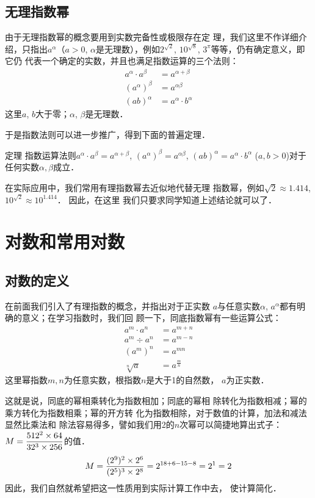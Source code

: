 \subsection{无理指数幂}
由于无理指数幂的概念要用到实数完备性或极限存在定
理，我们这里不作详细介绍，只指出$a^{\alpha}$（$a>0$, $\alpha$是无理数），例如$2^{\sqrt{2}}$, $10^{\sqrt{8}}$, $3^{\pi}$等等，仍有确定意义，即它仍
代表一个确定的实数，并且也满足指数运算的三个法则：
\[\begin{split}
    a^{\alpha}\cdot a^{\beta}&=a^{\alpha+\beta}\\
    \left(a^{\alpha}\right)^{\beta}&=a^{\alpha\beta}\\
    (ab)^{\alpha}&=a^{\alpha}\cdot b^{\alpha}
\end{split}\]
这里$a$, $b$大于零；$\alpha$, $\beta$是无理数．

于是指数法则可以进一步推广，得到下面的普遍定理．

\begin{blk}{定理}
    指数运算法则$a^{\alpha}\cdot a^{\beta}=a^{\alpha+\beta}$, $\left(a^{\alpha}\right)^{\beta}=a^{\alpha\beta}$, $(ab)^{\alpha}=a^{\alpha}\cdot b^{\alpha}$ ($a,b>0$)对于任何实数$\alpha, \beta$成立．
\end{blk}

在实际应用中，我们常用有理指数幂去近似地代替无理
指数幂，例如$\sqrt{2}\approx 1.414$, $10^{\sqrt{2}}\approx 10^{1.414}$．
因此，在这里
我们只要求同学知道上述结论就可以了．

\section{对数和常用对数}
\subsection{对数的定义}

在前面我们引入了有理指数的概念，并指出对于正实数
$a$与任意实数$\alpha$, $a^{\alpha}$都有明确的意义；在学习指数时，我们回
顾一下，同底指数幂有一些运算公式：
\[\begin{split}
    a^{m}\cdot a^n&=a^{m+n}\\
    a^{m}\div a^n&=a^{m-n}\\
    (a^m)^n&=a^{mn}\\
    \sqrt[n]{a}&=a^{\tfrac{m}{n}}
\end{split}\]
这里幂指数$m,n$为任意实数，根指数$n$是大于1的自然数，
$a$为正实数．

这就是说，同底的幂相乘转化为指数相加；同底的幂相
除转化为指数相减；幂的乘方转化为指数相乘；幂的开方转
化为指数相除，对于数值的计算，加法和减法显然比乘法和
除法容易得多，譬如我们用2的$n$次幂可以简捷地算出式子：
$M=\dfrac{512^2\times 64}{32^3\times 256}$的值．
\[M=\dfrac{(2^9)^2\times 2^6}{(2^5)^3\times 2^8}=2^{18+6-15-8}=2^1=2\]
因此，我们自然就希望把这一性质用到实际计算工作中去，
使计算简化．

